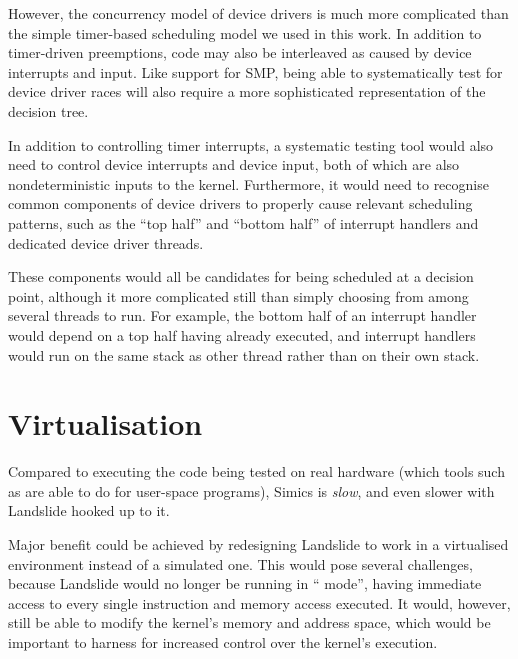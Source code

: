 However, the concurrency model of device drivers is much more complicated than the simple timer-based scheduling model we used in this work. In addition to timer-driven preemptions, code may also be interleaved as caused by device interrupts and input. Like support for SMP, being able to systematically test for device driver races will also require a more sophisticated representation of the decision tree.

In addition to controlling timer interrupts, a systematic testing tool would also need to control device interrupts and device input, both of which are also nondeterministic inputs to the kernel.
Furthermore, it would need to recognise common components of device drivers to properly cause relevant scheduling patterns, such as the ``top half'' and ``bottom half'' of interrupt handlers and dedicated device driver threads.

These components would all be candidates for being scheduled at a decision point, although it more complicated still than simply choosing from among several threads to run. For example, the bottom half of an interrupt handler would depend on a top half having already executed, and interrupt handlers would run on the same stack as other thread rather than on their own stack.


\section{Virtualisation}
\label{sec:future-virt}

Compared to executing the code being tested on real hardware (which tools such as \cite{dbug-ssv} are able to do for user-space programs), Simics is {\em slow}, and even slower with Landslide hooked up to it.

Major benefit could be achieved by redesigning Landslide to work in a virtualised environment instead of a simulated one. This would pose several challenges, because Landslide would no longer be running in `` mode'', having immediate access to every single instruction and memory access executed. It would, however, still be able to modify the kernel's memory and address space, which would be important to harness for increased control over the kernel's execution.

